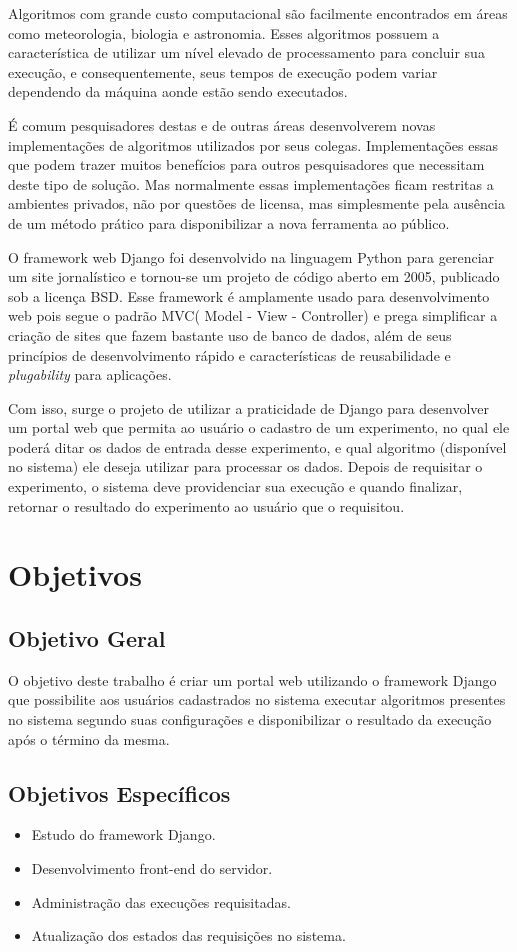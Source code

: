 \documentclass[12pt]{article}
\begin{document}
Algoritmos com grande custo computacional são facilmente encontrados em áreas como meteorologia, biologia e astronomia. Esses algoritmos possuem a característica de utilizar um nível elevado de processamento para concluir sua execução, e consequentemente, seus tempos de execução podem variar dependendo da máquina aonde estão sendo executados.

É comum pesquisadores destas e de outras áreas desenvolverem novas implementações de algoritmos utilizados por seus colegas. Implementações essas que podem trazer muitos benefícios para outros pesquisadores que necessitam deste tipo de solução. Mas normalmente essas implementações ficam restritas a ambientes privados, não por questões de licensa, mas simplesmente pela ausência de um método prático para disponibilizar a nova ferramenta ao público.

O framework web Django foi desenvolvido na linguagem Python para gerenciar um site jornalístico e tornou-se um projeto de código aberto em 2005, publicado sob a licença BSD. Esse framework é amplamente usado para desenvolvimento web pois segue o padrão MVC( Model - View - Controller) e prega simplificar a criação de sites que fazem bastante uso de banco de dados, além de seus princípios de desenvolvimento rápido e características de reusabilidade e \textit{plugability} para aplicações.

Com isso, surge o projeto de utilizar a praticidade de Django para desenvolver um portal web que permita ao usuário o cadastro de um experimento, no qual ele poderá ditar os dados de entrada desse experimento, e qual algoritmo (disponível no sistema) ele deseja utilizar para processar os dados. Depois de requisitar o experimento, o sistema deve providenciar sua execução e quando finalizar, retornar o resultado do experimento ao usuário que o requisitou.

\section{Objetivos}
\subsection{Objetivo Geral}
O objetivo deste trabalho é criar um portal web utilizando o framework Django que possibilite aos usuários cadastrados no sistema  executar algoritmos presentes no sistema segundo suas configurações e disponibilizar o resultado da execução após o término da mesma.

\subsection{Objetivos Específicos}
\begin{itemize}
	\item Estudo do framework Django.
	\item Desenvolvimento front-end do servidor.
	\item Administração das execuções requisitadas.
	\item Atualização dos estados das requisições no sistema.
    
\end{itemize}
\end{document}
